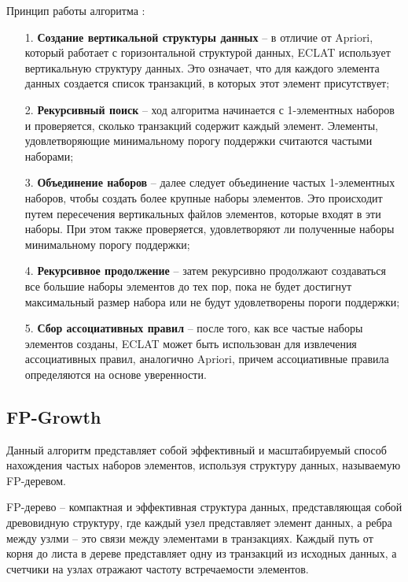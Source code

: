 Принцип работы алгоритма \cite{sr1}:
\begin{enumerate}
	\item[1.] \textbf{Создание вертикальной структуры данных} -- в отличие от Apriori, который работает с горизонтальной структурой данных, ECLAT использует вертикальную структуру данных. Это означает, что для каждого элемента данных создается список транзакций, в которых этот элемент присутствует;
	\item[2.] \textbf{Рекурсивный поиск} -- ход алгоритма начинается с 1-элементных наборов и проверяется, сколько транзакций содержит каждый элемент. Элементы, удовлетворяющие минимальному порогу поддержки считаются частыми наборами;
	\item[3.] \textbf{Объединение наборов} -- далее следует объединение частых 1-элементных наборов, чтобы создать более крупные наборы элементов. Это происходит путем пересечения вертикальных файлов элементов, которые входят в эти наборы. При этом также проверяется, удовлетворяют ли полученные наборы минимальному порогу поддержки;
	\item[4.] \textbf{Рекурсивное продолжение} -- затем рекурсивно продолжают создаваться все большие наборы элементов до тех пор, пока не будет достигнут максимальный размер набора или не будут удовлетворены пороги поддержки;
	\item[5.] \textbf{Сбор ассоциативных правил} -- после того, как все частые наборы элементов созданы, ECLAT может быть использован для извлечения ассоциативных правил, аналогично Apriori, причем ассоциативные правила определяются на основе уверенности.
\end{enumerate}

\subsection{FP-Growth}

Данный алгоритм представляет собой эффективный и масштабируемый способ нахождения частых наборов элементов, используя структуру данных, называемую FP-деревом.

FP-дерево -- компактная и эффективная структура данных, представляющая собой древовидную структуру, где каждый узел представляет элемент данных, а ребра между узлми -- это связи между элементами в транзакциях. Каждый путь от корня до листа в дереве представляет одну из транзакций из исходных данных, а счетчики на узлах отражают частоту встречаемости элементов. \cite{fpgrowth}

